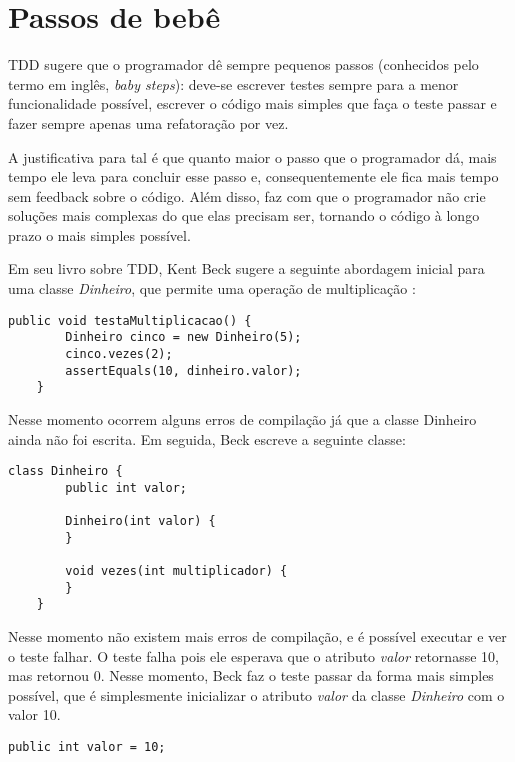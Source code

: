 \section{Passos de bebê}
\label{sec:tdd-baby-steps}

TDD sugere que o programador dê sempre pequenos passos (conhecidos pelo termo em inglês, \textit{baby steps}): deve-se escrever testes 
sempre para a menor funcionalidade possível, escrever o código mais simples que faça o teste passar e fazer sempre 
apenas uma refatoração por vez. 

A justificativa para tal é que quanto maior o passo que o programador dá, mais tempo ele leva para concluir esse passo e, 
consequentemente ele fica mais tempo sem feedback sobre o código. Além disso, faz com que o programador não crie 
soluções mais complexas do que elas precisam ser, tornando o código à longo prazo o mais simples possível.

Em seu livro sobre TDD, Kent Beck sugere a seguinte abordagem inicial para uma classe \textit{Dinheiro}, que permite uma operação de 
multiplicação \cite{TDDByExample}:

\begin{lstlisting}[frame=trbl]
    public void testaMultiplicacao() {
		Dinheiro cinco = new Dinheiro(5);
		cinco.vezes(2);
		assertEquals(10, dinheiro.valor);
	}
\end{lstlisting}

Nesse momento ocorrem alguns erros de compilação já que a classe Dinheiro ainda não foi escrita. Em seguida, Beck escreve
a seguinte classe:

\begin{lstlisting}[frame=trbl]
	class Dinheiro {
		public int valor;
		
		Dinheiro(int valor) {
		}
		
		void vezes(int multiplicador) {
		}
	}
\end{lstlisting}

Nesse momento não existem mais erros de compilação, e é possível executar e ver o teste falhar. O teste falha pois ele esperava
que o atributo \textit{valor} retornasse 10, mas retornou 0. Nesse momento, Beck faz o teste passar da forma mais simples possível,
que é simplesmente inicializar o atributo \textit{valor} da classe \textit{Dinheiro} com o valor 10.

\begin{lstlisting}[frame=trbl]
	public int valor = 10;
\end{lstlisting}

